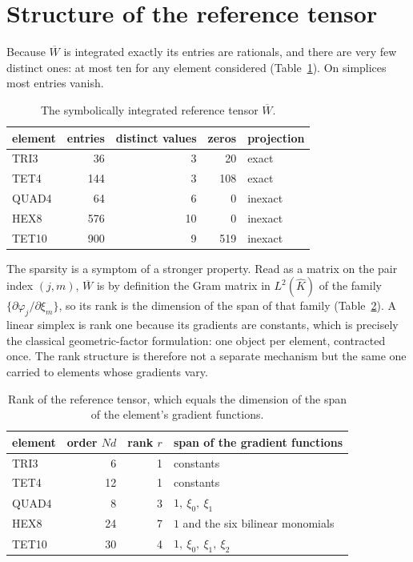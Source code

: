 \documentclass[11pt]{article}
\newcommand{\refcell}{\widehat{K}}
\newcommand{\Wbar}{\overline{W}}
\begin{document}
\section{Structure of the reference tensor}
\label{sec:refstructure}

Because $\Wbar$ is integrated exactly its entries are rationals, and there are
very few distinct ones: at most ten for any element considered
(Table~\ref{tab:reference}).  On simplices most entries vanish.

\begin{table}[ht]
\centering
\begin{tabular}{lrrrl}
\toprule
element & entries & distinct values & zeros & projection \\
\midrule
TRI3  &  36 &  3 &  20 & exact \\
TET4  & 144 &  3 & 108 & exact \\
QUAD4 &  64 &  6 &   0 & inexact \\
HEX8  & 576 & 10 &   0 & inexact \\
TET10 & 900 &  9 & 519 & inexact \\
\bottomrule
\end{tabular}
\caption{The symbolically integrated reference tensor $\Wbar$.}
\label{tab:reference}
\end{table}

The sparsity is a symptom of a stronger property.  Read as a matrix on the pair
index $(j,m)$, $\Wbar$ is by definition the Gram matrix in $L^2(\refcell)$ of the
family $\{\partial\varphi_j/\partial\xi_m\}$, so its rank is the dimension of the
span of that family (Table~\ref{tab:rank}).  A linear simplex is rank one because
its gradients are constants, which is precisely the classical geometric-factor
formulation: one object per element, contracted once.  The rank structure is
therefore not a separate mechanism but the same one carried to elements whose
gradients vary.

\begin{table}[ht]
\centering
\begin{tabular}{lrrl}
\toprule
element & order $Nd$ & rank $r$ & span of the gradient functions \\
\midrule
TRI3  &  6 & 1 & constants \\
TET4  & 12 & 1 & constants \\
QUAD4 &  8 & 3 & $1,\ \xi_0,\ \xi_1$ \\
HEX8  & 24 & 7 & $1$ and the six bilinear monomials \\
TET10 & 30 & 4 & $1,\ \xi_0,\ \xi_1,\ \xi_2$ \\
\bottomrule
\end{tabular}
\caption{Rank of the reference tensor, which equals the dimension of the span of
the element's gradient functions.}
\label{tab:rank}
\end{table}
\end{document}
